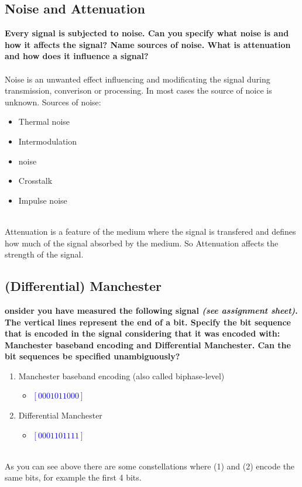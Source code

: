 \documentclass[a4paper,12pt]{article}
\begin{document}
\subsection{Noise and Attenuation}
\textbf{Every signal is subjected to noise.  Can you specify what noise is and how it affects the signal? Name sources of noise.  What is attenuation and how does it influence a signal?}\\
\\
Noise is an unwanted effect influencing and modificating the signal during transmission, converison or processing. In most cases the source of noice is unknown. Sources of noise:
\begin{itemize}[itemsep=0pt]
	\item Thermal noise
	\item Intermodulation
	\item noise
	\item Crosstalk
	\item Impulse noise
\end{itemize}
\\
Attenuation is a feature of the medium where the signal is transfered and defines how much of the signal absorbed by the medium. So Attenuation affects the strength of the signal.

\pagebreak
\subsection{(Differential) Manchester}
\textbf{onsider you have measured the following signal \textit{(see assignment sheet)}.\\
The vertical lines represent the end of a bit.  Specify the bit sequence that is encoded in the signal considering that it was encoded with: Manchester baseband encoding and Differential Manchester. Can the bit sequences be specified unambiguously?}

\begin{enumerate}[itemsep=0pt]
	\item Manchester baseband encoding (also called biphase-level)
	\begin{itemize}
		\item \textcolor{blue}{$[0001011000]$}
	\end{itemize}
	\item Differential Manchester
	\begin{itemize}
		\item \textcolor{blue}{$[0001101111]$}
	\end{itemize}
\end{enumerate}
\\
As you can see above there are some constellations where (1) and (2) encode the same bits, for example the first 4 bits.
	
\end{document}
